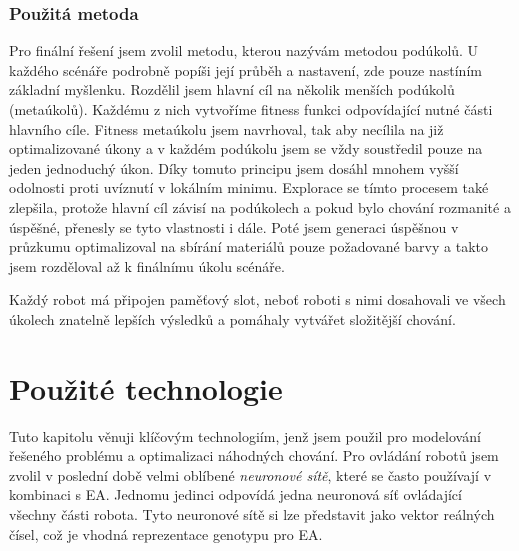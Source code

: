 \subsubsection*{Použitá metoda}
Pro finální řešení jsem zvolil metodu, kterou nazývám metodou podúkolů. U každého scénáře podrobně popíši její průběh a nastavení, zde pouze nastíním základní  myšlenku. Rozdělil jsem hlavní cíl na několik menších podúkolů (metaúkolů). Každému z nich vytvoříme fitness funkci odpovídající nutné části hlavního cíle. Fitness metaúkolu jsem navrhoval, tak aby necílila na již optimalizované úkony a v každém podúkolu jsem se vždy soustředil pouze na jeden jednoduchý úkon. Díky tomuto principu jsem dosáhl mnohem vyšší odolnosti proti uvíznutí v lokálním minimu. Explorace se tímto procesem také zlepšila, protože hlavní cíl závisí na podúkolech a pokud bylo chování rozmanité a úspěšné, přenesly se tyto vlastnosti i dále. Poté jsem generaci úspěšnou v průzkumu optimalizoval na sbírání materiálů pouze požadované barvy a takto jsem rozděloval až k finálnímu úkolu scénáře. 
\par 
Každý robot má připojen paměťový slot, neboť roboti s nimi dosahovali ve všech úkolech znatelně lepších výsledků a pomáhaly vytvářet složitější chování. 
\section{Použité technologie}
Tuto kapitolu věnuji klíčovým technologiím, jenž jsem použil pro modelování řešeného problému a optimalizaci náhodných chování. Pro ovládání robotů jsem zvolil v poslední době velmi oblíbené \textit{neuronové sítě}, které se často používají v kombinaci s EA. Jednomu jedinci odpovídá jedna neuronová síť ovládající všechny části robota. Tyto neuronové sítě si lze představit jako vektor reálných čísel, což je vhodná reprezentace genotypu pro EA. 
